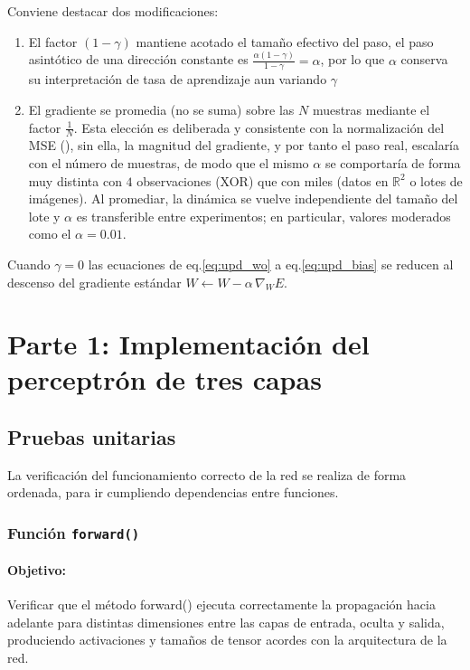 \documentclass[11pt,a4paper]{article}
\begin{document}
Conviene destacar dos modificaciones:
\begin{enumerate}
  \item El factor $(1-\gamma)$ mantiene acotado el tamaño efectivo del paso, el
        paso asintótico de una dirección constante es
        $\frac{\alpha(1-\gamma)}{1-\gamma}=\alpha$, por lo que $\alpha$ conserva
        su interpretación de tasa de aprendizaje aun variando $\gamma$
  \item El gradiente se promedia (no se suma) sobre las $N$ muestras
        mediante el factor $\frac{1}{N}$. Esta elección es deliberada y
        consistente con la normalización del MSE (), sin ella, la
        magnitud del gradiente, y por tanto el paso real, escalaría con el número
        de muestras, de modo que el mismo $\alpha$ se comportaría de forma muy
        distinta con $4$ observaciones (XOR) que con miles (datos en
        $\mathbb{R}^2$ o lotes de imágenes). Al promediar, la dinámica se vuelve independiente del tamaño del lote y $\alpha$ es transferible entre
        experimentos; en particular, valores moderados como el $\alpha=0.01$.
\end{enumerate}

Cuando $\gamma=0$ las ecuaciones de eq.\ref{eq:upd_wo} a eq.\ref{eq:upd_bias} se
reducen al descenso del gradiente estándar
$W \leftarrow W-\alpha\,\nabla_{\!W}E$.

\section{Parte 1: Implementación del perceptrón de tres capas}\label{sec:parte1}

\subsection{Pruebas unitarias}\label{sec:pruebas1}

La verificación del funcionamiento correcto de la red se realiza de forma ordenada, para ir cumpliendo dependencias entre funciones. 

\subsubsection{Función \texttt{forward()}} 
\paragraph{Objetivo:} Verificar que el método forward() ejecuta correctamente la propagación hacia adelante para distintas dimensiones entre las capas de entrada, oculta y salida, produciendo activaciones y tamaños de tensor acordes con la arquitectura de la red.
\end{document}
